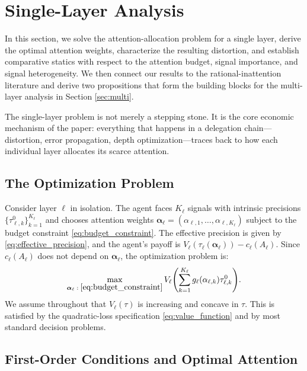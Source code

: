 \section{Single-Layer Analysis}
\label{sec:single}

In this section, we solve the attention-allocation problem for a single layer, derive the optimal attention weights, characterize the resulting distortion, and establish comparative statics with respect to the attention budget, signal importance, and signal heterogeneity. We then connect our results to the rational-inattention literature and derive two propositions that form the building blocks for the multi-layer analysis in Section \ref{sec:multi}.

The single-layer problem is not merely a stepping stone. It is the core economic mechanism of the paper: everything that happens in a delegation chain---distortion, error propagation, depth optimization---traces back to how each individual layer allocates its scarce attention.

\subsection{The Optimization Problem}
\label{subsec:single_opt}

Consider layer $\ell$ in isolation. The agent faces $K_\ell$ signals with intrinsic precisions $\{\tau^0_{\ell,k}\}_{k=1}^{K_\ell}$ and chooses attention weights $\boldsymbol{\alpha}_\ell = (\alpha_{\ell,1}, \ldots, \alpha_{\ell,K_\ell})$ subject to the budget constraint \eqref{eq:budget_constraint}. The effective precision is given by \eqref{eq:effective_precision}, and the agent's payoff is $V_\ell(\tau_\ell(\boldsymbol{\alpha}_\ell)) - c_\ell(A_\ell)$. Since $c_\ell(A_\ell)$ does not depend on $\boldsymbol{\alpha}_\ell$, the optimization problem is:
\begin{equation}\label{eq:single_opt}
\max_{\boldsymbol{\alpha}_\ell \;:\; \eqref{eq:budget_constraint}} V_\ell\Biggl(\sum_{k=1}^{K_\ell} g_\ell(\alpha_{\ell,k}) \tau^0_{\ell,k}\Biggr).
\end{equation}
We assume throughout that $V_\ell(\tau)$ is increasing and concave in $\tau$. This is satisfied by the quadratic-loss specification \eqref{eq:value_function} and by most standard decision problems.

\subsection{First-Order Conditions and Optimal Attention}
\label{subsec:foc}

